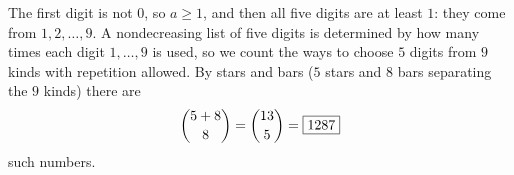 The first digit is not $0$, so $a\ge1$, and then all five digits are at least $1$: they come from $1,2,\dots,9$. A nondecreasing list of five digits is determined by how many times each digit $1,\dots,9$ is used, so we count the ways to choose $5$ digits from $9$ kinds with repetition allowed. By stars and bars ($5$ stars and $8$ bars separating the $9$ kinds) there are
\[\dbinom{5+8}{8}=\dbinom{13}{5}=\boxed{1287}\]
such numbers.
